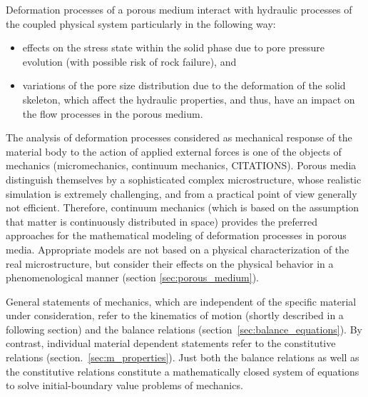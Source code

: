 Deformation processes of a porous medium interact with hydraulic processes of the coupled physical system particularly in the following way:

\begin{itemize}
\item effects on the stress state within the solid phase due to pore pressure evolution (with possible risk of rock failure), and
\item variations of the pore size distribution due to the deformation of the solid skeleton, which affect the hydraulic properties, and thus, have an impact on the flow processes in the porous medium.
\end{itemize}

The analysis of deformation processes considered as mechanical response of the material body to the action of applied external forces is one of the objects of mechanics (micromechanics, continuum mechanics, CITATIONS). Porous media distinguish themselves by a sophisticated complex microstructure, whose realistic simulation is extremely challenging, and from a practical point of view generally not efficient. Therefore, continuum mechanics (which is based on the assumption that matter is continuously distributed in space) provides the preferred approaches for the mathematical modeling of deformation processes in porous media. Appropriate models are not based on a physical characterization of the real microstructure, but consider their effects on the physical behavior in a phenomenological manner (section \ref{sec:porous_medium}).

General statements of mechanics, which are independent of the specific material under consideration, refer to the kinematics of motion (shortly described in a following section) and the balance relations (section~\ref{sec:balance_equations}). By contrast, individual material dependent statements refer to the constitutive relations (section.~\ref{sec:m_properties}). Just both the balance relations as well as the constitutive relations constitute a mathematically closed system of equations to solve initial-boundary value problems of mechanics.




